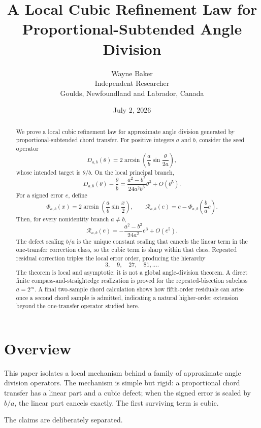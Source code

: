 \documentclass[11pt]{article}
\title{A Local Cubic Refinement Law for Proportional-Subtended Angle Division}
\author{Wayne Baker\\Independent Researcher\\Goulds, Newfoundland and Labrador, Canada}
\date{July 2, 2026}
\theoremstyle{definition}
\theoremstyle{remark}
\newcommand{\Rop}{\mathscr{R}}
\newcommand{\Phiop}{\Phi}
\begin{document}
\maketitle

\begin{abstract}
We prove a local cubic refinement law for approximate angle division generated
by proportional-subtended chord transfer.  For positive integers $a$ and $b$,
consider the seed operator
\[
D_{a,b}(\theta)
=
2\arcsin\!\left(
\frac{a}{b}\sin\frac{\theta}{2a}
\right),
\]
whose intended target is $\theta/b$.  On the local principal branch,
\[
D_{a,b}(\theta)-\frac{\theta}{b}
=
\frac{a^2-b^2}{24a^2b^3}\theta^3+O(\theta^5).
\]
For a signed error $e$, define
\[
\Phiop_{a,b}(x)
=
2\arcsin\!\left(
\frac{a}{b}\sin\frac{x}{2}
\right),
\qquad
\Rop_{a,b}(e)
=
e-
\Phiop_{a,b}\!\left(\frac{b}{a}e\right).
\]
Then, for every nonidentity branch $a\ne b$,
\[
\Rop_{a,b}(e)
=
-
\frac{a^2-b^2}{24a^2}e^3+O(e^5).
\]
The defect scaling $b/a$ is the unique constant scaling that cancels the
linear term in the one-transfer correction class, so the cubic term is sharp
within that class.  Repeated residual correction triples the local error
order, producing the hierarchy
\[
3,\quad 9,\quad 27,\quad 81,\ldots .
\]
The theorem is local and asymptotic; it is not a global angle-division theorem.
A direct finite compass-and-straightedge realization is proved for the
repeated-bisection subclass $a=2^m$.  A final two-sample chord calculation
shows how fifth-order residuals can arise once a second chord sample is
admitted, indicating a natural higher-order extension beyond the one-transfer
operator studied here.
\end{abstract}

\section*{Overview}
\label{sec:overview}

This paper isolates a local mechanism behind a family of approximate angle
division operators.  The mechanism is simple but rigid: a proportional chord
transfer has a linear part and a cubic defect; when the signed error is scaled
by $b/a$, the linear part cancels exactly.  The first surviving term is cubic.

The claims are deliberately separated.
\end{document}
